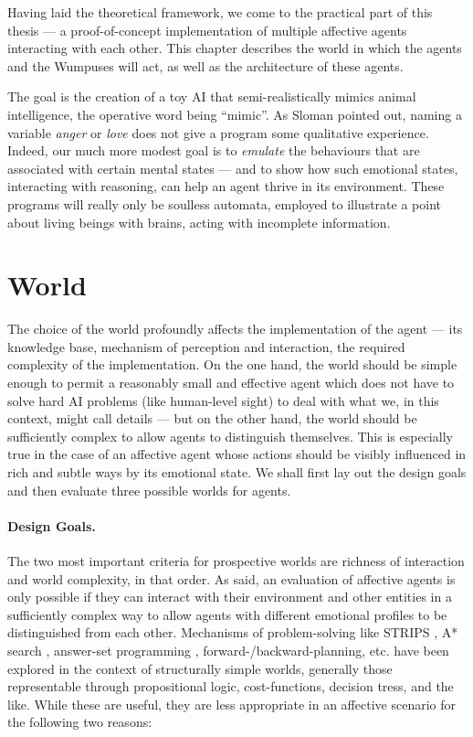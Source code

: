 Having laid the theoretical framework, we come to the practical part of this thesis --- a proof-of-concept implementation of multiple affective agents interacting with each other. This chapter describes the world in which the agents and the Wumpuses will act, as well as the architecture of these agents.

The goal is the creation of a toy AI that semi-realistically mimics animal intelligence, the operative word being ``mimic''. As Sloman \cite{sloman2000} pointed out, naming a variable \emph{anger} or \emph{love} does not give a program some qualitative experience. Indeed, our much more modest goal is to \emph{emulate} the behaviours that are associated with certain mental states --- and to show how such emotional states, interacting with reasoning, can help an agent thrive in its environment. These programs will really only be soulless automata, employed to illustrate a point about living beings with brains, acting with incomplete information.

\section{World}

The choice of the world profoundly affects the implementation of the agent --- its knowledge base, mechanism of perception and interaction, the required complexity of the implementation. On the one hand, the world should be simple enough to permit a reasonably small and effective agent which does not have to solve hard AI problems (like human-level sight) to deal with what we, in this context, might call details --- but on the other hand, the world should be sufficiently complex to allow agents to distinguish themselves. This is especially true in the case of an affective agent whose actions should be visibly influenced in rich and subtle ways by its emotional state. We shall first lay out the design goals and then evaluate three possible worlds for agents.

\paragraph{Design Goals.} The two most important criteria for prospective worlds are richness of interaction and world complexity, in that order. As said, an evaluation of affective agents is only possible if they can interact with their environment and other entities in a sufficiently complex way to allow agents with different emotional profiles to be distinguished from each other. Mechanisms of problem-solving like STRIPS \cite{fikesNilsson}, A* search \cite{nilssonAStar}, answer-set programming \cite{asp1}, forward-/backward-planning, etc. have been explored in the context of structurally simple worlds, generally those representable through propositional logic, cost-functions, decision tress, and the like. While these are useful, they are less appropriate in an affective scenario for the following two reasons:

